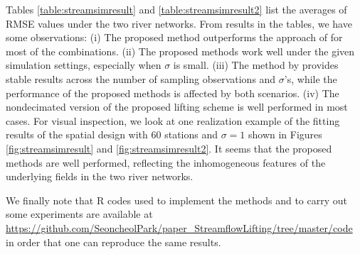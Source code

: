 \documentclass[11pt,titlepage]{article}
\begin{document}
Tables \ref{table:streamsimresult} and \ref{table:streamsimresult2} list the averages of RMSE values under the two river networks. From results in the tables, we have some observations: (i) The proposed method outperforms the approach of \cite{ODonnell2014} for most of the combinations. (ii) The proposed methods work well under the given simulation settings, especially when $\sigma$ is small. (iii) The method by \cite{ODonnell2014} provides stable results across the number of sampling observations and $\sigma$'s, while the performance of the proposed methods is affected by both scenarios. (iv) The nondecimated version of the proposed lifting scheme is well performed in most cases. 
For visual inspection, we look at one realization example of the fitting results of the spatial design with 60 stations and $\sigma=1$ shown in Figures \ref{fig:streamsimresult} and \ref{fig:streamsimresult2}. It seems that the proposed methods are well performed, reflecting the inhomogeneous features of the underlying fields in the two river networks.   

We finally note that R codes used to implement the methods and to carry out some experiments are available at \url{https://github.com/SeoncheolPark/paper_StreamflowLifting/tree/master/code} in order that one can reproduce the same results. 
\end{document}
